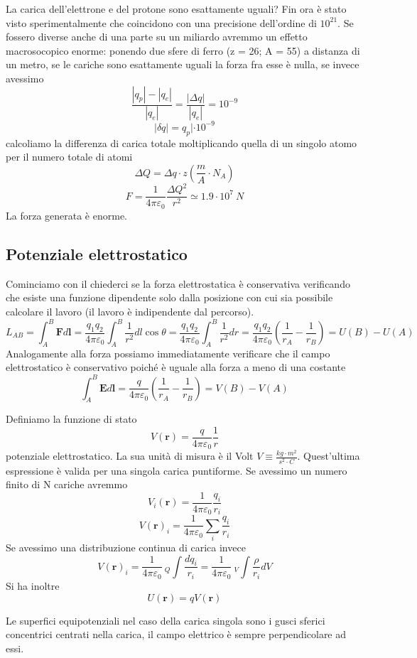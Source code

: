 \documentclass[
10pt, %
a4paper, %
oneside, %
headinclude,footinclude, %
BCOR5mm, %
]{scrartcl}
\begin{document}
La carica dell'elettrone e del protone sono esattamente uguali? Fin ora è stato visto sperimentalmente che coincidono con una precisione dell'ordine di \(10^{21}\). Se fossero diverse anche di una parte su un miliardo avremmo un effetto macrosocopico enorme: ponendo due sfere di ferro (z = 26; A = 55) a distanza di un metro, se le cariche sono esattamente uguali la forza fra esse è nulla, se invece avessimo 
\[\frac{|q_p|-|q_e|}{|q_e|} = \frac{|\Delta q|}{|q_e|}=10^{-9}\]
\[|\delta q| = q_p|\cdot10^{-9}\]
calcoliamo la differenza di carica totale moltiplicando quella di un singolo atomo per il numero totale di atomi
\[\Delta Q = \Delta q\cdot z \left(\frac{m}{A}\cdot N_A\right) \]
\[F=\frac{1}{4\pi\varepsilon_0}\frac{\Delta Q^2}{r^2}\simeq 1.9\cdot10^{7}\ N\]
La forza generata è enorme. 
\subsection{Potenziale elettrostatico}
Cominciamo con il chiederci se la forza elettrostatica è conservativa verificando che esiste una funzione dipendente solo dalla posizione con cui sia possibile calcolare il lavoro (il lavoro è indipendente dal percorso). 
\[L_{AB} = \int_{A}^{B}\mathbf{F}d\mathbf{l}= \frac{q_1q_2}{4\pi\varepsilon_0}\int_{A}^{B}\frac{1}{r^2}dl\cos\theta=\frac{q_1q_2}{4\pi\varepsilon_0}\int_{A}^{B}\frac{1}{r^2}dr=\frac{q_1q_2}{4\pi\varepsilon_0}\left(\frac{1}{r_A}-\frac{1}{r_B}\right)=U(B)-U(A)\]
Analogamente alla forza possiamo immediatamente verificare che il campo elettrostatico è conservativo poiché è uguale alla forza a meno di una costante
\[\int_{A}^{B}\mathbf{E}d\mathbf{l}=\frac{q}{4\pi\varepsilon_0}\left(\frac{1}{r_A}-\frac{1}{r_B}\right)=V(B)-V(A)\]
\begin{definizione}
Definiamo la funzione di stato 
\[V(\mathbf{r}) = \frac{q}{4\pi\varepsilon_0}\frac{1}{r}\]
potenziale elettrostatico. La sua unità di misura è il Volt $V \equiv \frac{kg\cdot m^2}{s^2\cdot C}$.  Quest'ultima espressione è valida per una singola carica puntiforme. Se avessimo un numero finito di N cariche avremmo
\[V_i(\mathbf{r}) = \frac{1}{4\pi\varepsilon_0}\frac{q_i}{r_i}\]
\[V(\mathbf{r})_i= \frac{1}{4\pi\varepsilon_0}\sum_{i}\frac{q_i}{r_i}\]
Se avessimo una distribuzione continua di carica invece
\[V(\mathbf{r})_i= \frac{1}{4\pi\varepsilon_0}\ _Q\int\frac{d q_i}{r_i} =  \frac{1}{4\pi\varepsilon_0}\ _V\int\frac{\rho}{ r_i}dV\]
Si ha inoltre 
\[U(\mathbf{r})=qV(\mathbf{r})\]
\end{definizione}
Le superfici equipotenziali nel caso della carica singola sono i gusci sferici concentrici centrati nella carica, il campo elettrico è sempre perpendicolare ad essi.\\
\end{document}
